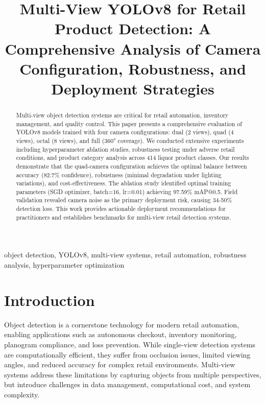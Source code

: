 \documentclass[conference]{IEEEtran}
\begin{document}
\title{Multi-View YOLOv8 for Retail Product Detection: A Comprehensive Analysis of Camera Configuration, Robustness, and Deployment Strategies}

\author{
}

\maketitle

\begin{abstract}
Multi-view object detection systems are critical for retail automation, inventory management, and quality control. This paper presents a comprehensive evaluation of YOLOv8 models trained with four camera configurations: dual (2 views), quad (4 views), octal (8 views), and full (360° coverage). We conducted extensive experiments including hyperparameter ablation studies, robustness testing under adverse retail conditions, and product category analysis across 414 liquor product classes. Our results demonstrate that the quad-camera configuration achieves the optimal balance between accuracy (82.7\% confidence), robustness (minimal degradation under lighting variations), and cost-effectiveness. The ablation study identified optimal training parameters (SGD optimizer, batch=16, lr=0.01) achieving 97.59\% mAP@0.5. Field validation revealed camera noise as the primary deployment risk, causing 34-50\% detection loss. This work provides actionable deployment recommendations for practitioners and establishes benchmarks for multi-view retail detection systems.
\end{abstract}

\begin{IEEEkeywords}
object detection, YOLOv8, multi-view systems, retail automation, robustness analysis, hyperparameter optimization
\end{IEEEkeywords}

\section{Introduction}
Object detection is a cornerstone technology for modern retail automation, enabling applications such as autonomous checkout, inventory monitoring, planogram compliance, and loss prevention. While single-view detection systems are computationally efficient, they suffer from occlusion issues, limited viewing angles, and reduced accuracy for complex retail environments. Multi-view systems address these limitations by capturing objects from multiple perspectives, but introduce challenges in data management, computational cost, and system complexity.
\end{document}

